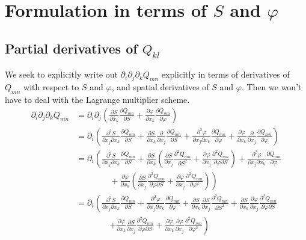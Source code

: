 \documentclass[reqno]{article}
\begin{document}
	\section{Formulation in terms of $S$ and $\varphi$}
	
	\subsection{Partial derivatives of $Q_{kl}$}
	We seek to explicitly write out $\partial_i \partial_j \partial_k Q_{mn}$ explicitly in terms of derivatives of $Q_{mn}$ with respect to $S$ and $\varphi$, and spatial derivatives of $S$ and $\varphi$. Then we won't have to deal with the Lagrange multiplier scheme. 
	\begin{equation}\label{eq:chainrule}
	\begin{split}
		\partial_i\partial_j\partial_k Q_{mn} &= \partial_i\partial_j\left(\frac{\partial S}{\partial x_k} \frac{\partial Q_{mn}}{\partial S} + \frac{\partial \varphi}{\partial x_k} \frac{\partial Q_{mn}}{\partial \varphi}\right) \\
		&= \partial_i\left( \frac{\partial^2 S}{\partial x_j \partial x_k} \frac{\partial Q_{mn}}{\partial S} + \frac{\partial S}{\partial x_k} \frac{\partial}{\partial x_j} \frac{\partial Q_{mn}}{\partial S} + \frac{\partial^2 \varphi}{\partial x_j \partial x_k} \frac{\partial Q_{mn}}{\partial \varphi} + \frac{\partial \varphi}{\partial x_k} \frac{\partial}{\partial x_j}\frac{\partial Q_{mn}}{\partial \varphi} \right) \\
		&= \partial_i\left( \frac{\partial^2 S}{\partial x_j \partial x_k} \frac{\partial Q_{mn}}{\partial S} + \frac{\partial S}{\partial x_k} \left( \frac{\partial S}{\partial x_j} \frac{\partial^2 Q_{mn}}{\partial S^2} + \frac{\partial \varphi}{\partial x_j} \frac{\partial^2 Q_{mn}}{\partial \varphi \partial S} \right) + \frac{\partial^2 \varphi}{\partial x_j \partial x_k} \frac{\partial Q_{mn}}{\partial \varphi}\right. \\ 
		&\qquad\qquad+ \left.\frac{\partial \varphi}{\partial x_k} \left( \frac{\partial S}{\partial x_j} \frac{\partial^2 Q_{mn}}{\partial \varphi \partial S} + \frac{\partial \varphi}{\partial x_j} \frac{\partial^2 Q_{mn}}{\partial \varphi^2} \right) \right) \\
		&= \partial_i \left( \frac{\partial^2 S}{\partial x_j \partial x_k}\frac{\partial Q_{mn}}{\partial S} + \frac{\partial^2 \varphi}{\partial x_j\partial x_k} \frac{\partial Q_{mn}}{\partial \varphi} + \frac{\partial S}{\partial x_k}\frac{\partial S}{\partial x_j} \frac{\partial^2 Q_{mn}}{\partial S^2} + \frac{\partial S}{\partial x_k} \frac{\partial \varphi}{\partial x_j} \frac{\partial^2 Q_{mn}}{\partial \varphi \partial S} \right. \\
		&\qquad\qquad \left.+ \frac{\partial \varphi}{\partial x_k} \frac{\partial S}{\partial x_j} \frac{\partial^2 Q_{mn}}{\partial \varphi \partial S} + \frac{\partial \varphi}{\partial x_k}\frac{\partial \varphi}{\partial x_j} \frac{\partial^2 Q_{mn}}{\partial \varphi^2}\right)
	\end{split}
	\end{equation}
\end{document}
